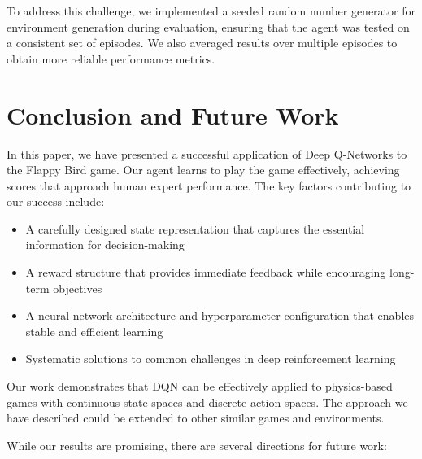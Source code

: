 \documentclass[conference]{IEEEtran}
\begin{document}
To address this challenge, we implemented a seeded random number generator for environment generation during evaluation, ensuring that the agent was tested on a consistent set of episodes. We also averaged results over multiple episodes to obtain more reliable performance metrics.

\section{Conclusion and Future Work}
\label{sec:conclusion}

In this paper, we have presented a successful application of Deep Q-Networks to the Flappy Bird game. Our agent learns to play the game effectively, achieving scores that approach human expert performance. The key factors contributing to our success include:

\begin{itemize}
    \item A carefully designed state representation that captures the essential information for decision-making
    \item A reward structure that provides immediate feedback while encouraging long-term objectives
    \item A neural network architecture and hyperparameter configuration that enables stable and efficient learning
    \item Systematic solutions to common challenges in deep reinforcement learning
\end{itemize}

Our work demonstrates that DQN can be effectively applied to physics-based games with continuous state spaces and discrete action spaces. The approach we have described could be extended to other similar games and environments.

While our results are promising, there are several directions for future work:
\end{document}
